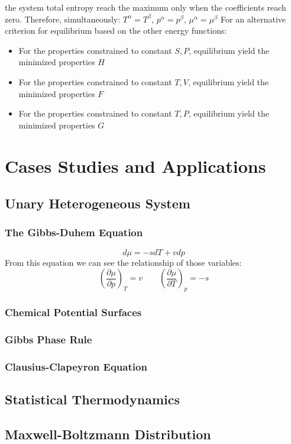 \documentclass[UTF8]{book}
\begin{document}
 {the system total entropy reach the maximum only when the coefficients reach zero. Therefore, simultaneously: $T^\alpha =T^\beta $, $p^\alpha =p^\beta $, $\mu ^\alpha =\mu ^\beta $}
 {For an alternative criterion for equilibrium based on the other energy functions: }
\begin{itemize}
\item  {For the properties constrained to constant $S,P$, equilibrium yield the minimized properties $H$}
\item  {For the properties constrained to constant $T,V$, equilibrium yield the minimized properties $F$}
\item  {For the properties constrained to constant $T,P$, equilibrium yield the minimized properties $G$}
\end{itemize}

\chapter{Cases Studies and Applications}
\section{Unary Heterogeneous System}
\subsection{The Gibbs-Duhem Equation}
$$d\mu =-sdT+vdp$$
 {From this equation we can see the relationship of those variables:}
$$\left(\dfrac{\partial \mu }{\partial p}\right)_T=v \qquad \left(\dfrac{\partial \mu}{\partial T}\right)_p=-s$$
\subsection{Chemical Potential Surfaces}

\subsection{Gibbs Phase Rule}
\subsection{Clausius-Clapeyron Equation}
\section{Statistical Thermodynamics}
\section{Maxwell-Boltzmann Distribution}
\end{document}
